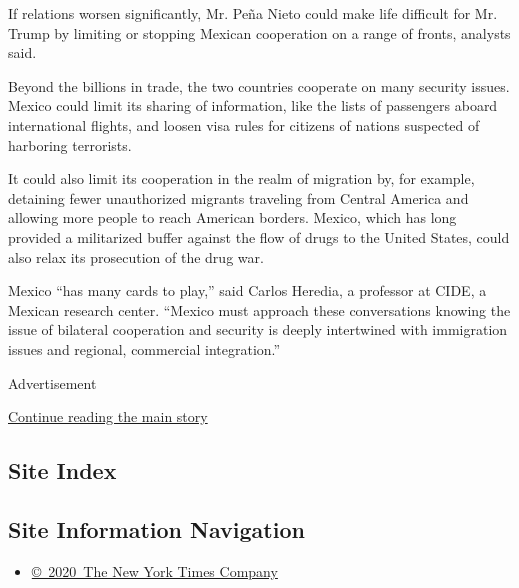 If relations worsen significantly, Mr. Peña Nieto could make life
difficult for Mr. Trump by limiting or stopping Mexican cooperation on a
range of fronts, analysts said.

Beyond the billions in trade, the two countries cooperate on many
security issues. Mexico could limit its sharing of information, like the
lists of passengers aboard international flights, and loosen visa rules
for citizens of nations suspected of harboring terrorists.

It could also limit its cooperation in the realm of migration by, for
example, detaining fewer unauthorized migrants traveling from Central
America and allowing more people to reach American borders. Mexico,
which has long provided a militarized buffer against the flow of drugs
to the United States, could also relax its prosecution of the drug war.

Mexico ``has many cards to play,'' said Carlos Heredia, a professor at
CIDE, a Mexican research center. ``Mexico must approach these
conversations knowing the issue of bilateral cooperation and security is
deeply intertwined with immigration issues and regional, commercial
integration.''

Advertisement

\protect\hyperlink{after-bottom}{Continue reading the main story}

\hypertarget{site-index}{%
\subsection{Site Index}\label{site-index}}

\hypertarget{site-information-navigation}{%
\subsection{Site Information
Navigation}\label{site-information-navigation}}

\begin{itemize}
\tightlist
\item
  \href{https://help.nytimes.com/hc/en-us/articles/115014792127-Copyright-notice}{©~2020~The
  New York Times Company}
\end{itemize}

